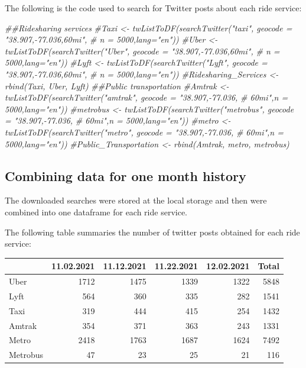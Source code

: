 \documentclass[
  12pt,
]{article}
\newenvironment{Shaded}{\begin{snugshade}}{\end{snugshade}}
\newcommand{\CommentTok}[1]{\textcolor[rgb]{0.56,0.35,0.01}{\textit{#1}}}
\begin{document}
The following is the code used to search for Twitter posts about each
ride service:

\begin{Shaded}
\begin{Highlighting}[]
\CommentTok{##Ridesharing services}
\CommentTok{#Taxi <- twListToDF(searchTwitter("taxi", geocode = "38.907,-77.036,60mi",}
\CommentTok{#                                  n = 5000,lang="en"))}
\CommentTok{#Uber <- twListToDF(searchTwitter("Uber", geocode = "38.907,-77.036,60mi",}
\CommentTok{#                                  n = 5000,lang="en"))}
\CommentTok{#Lyft <- twListToDF(searchTwitter("Lyft", geocode = "38.907,-77.036,60mi",}
\CommentTok{#                                  n = 5000,lang="en"))}
\CommentTok{#Ridesharing_Services <- rbind(Taxi, Uber, Lyft)}
\CommentTok{##Public transportation}
\CommentTok{#Amtrak <- twListToDF(searchTwitter("amtrak", geocode = "38.907,-77.036,}
\CommentTok{#                                    60mi",n = 5000,lang="en"))}
\CommentTok{#metrobus <- twListToDF(searchTwitter("metrobus", geocode = "38.907,-77.036,}
\CommentTok{#                                      60mi",n = 5000,lang="en"))}
\CommentTok{#metro <- twListToDF(searchTwitter("metro", geocode = "38.907,-77.036,}
\CommentTok{#                                   60mi",n = 5000,lang="en"))}
\CommentTok{#Public_Transportation <- rbind(Amtrak, metro, metrobus)}
\end{Highlighting}
\end{Shaded}

\hypertarget{combining-data-for-one-month-history}{%
\subsection{Combining data for one month
history}\label{combining-data-for-one-month-history}}

The downloaded searches were stored at the local storage and then were
combined into one dataframe for each ride service.

The following table summaries the number of twitter posts obtained for
each ride service:

\begin{tabular}[t]{l|r|r|r|r|r}
\hline
  & 11.02.2021 & 11.12.2021 & 11.22.2021 & 12.02.2021 & Total\\
\hline
Uber & 1712 & 1475 & 1339 & 1322 & 5848\\
\hline
Lyft & 564 & 360 & 335 & 282 & 1541\\
\hline
Taxi & 319 & 444 & 415 & 254 & 1432\\
\hline
Amtrak & 354 & 371 & 363 & 243 & 1331\\
\hline
Metro & 2418 & 1763 & 1687 & 1624 & 7492\\
\hline
Metrobus & 47 & 23 & 25 & 21 & 116\\
\hline
\end{tabular}
\end{document}
